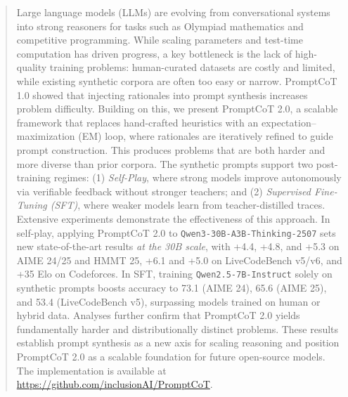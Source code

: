 \begin{abstract}
Large language models (LLMs) are evolving from conversational systems into strong reasoners for tasks such as Olympiad mathematics and competitive programming. While scaling parameters and test-time computation has driven progress, a key bottleneck is the lack of high-quality training problems: human-curated datasets are costly and limited, while existing synthetic corpora are often too easy or narrow. PromptCoT 1.0 showed that injecting rationales into prompt synthesis increases problem difficulty. Building on this, we present PromptCoT 2.0, a scalable framework that replaces hand-crafted heuristics with an expectation–maximization (EM) loop, where rationales are iteratively refined to guide prompt construction. This produces problems that are both harder and more diverse than prior corpora. The synthetic prompts support two post-training regimes: (1) \emph{Self-Play}, where strong models improve autonomously via verifiable feedback without stronger teachers; and (2) \emph{Supervised Fine-Tuning (SFT)}, where weaker models learn from teacher-distilled traces. Extensive experiments demonstrate the effectiveness of this approach. In self-play, applying PromptCoT 2.0 to \texttt{Qwen3-30B-A3B-Thinking-2507} sets new state-of-the-art results \emph{at the 30B scale}, with +4.4, +4.8, and +5.3 on AIME 24/25 and HMMT 25, +6.1 and +5.0 on LiveCodeBench v5/v6, and +35 Elo on Codeforces. In SFT, training \texttt{Qwen2.5-7B-Instruct} solely on synthetic prompts boosts accuracy to 73.1 (AIME 24), 65.6 (AIME 25), and 53.4 (LiveCodeBench v5), surpassing models trained on human or hybrid data. Analyses further confirm that PromptCoT 2.0 yields fundamentally harder and distributionally distinct problems. These results establish prompt synthesis as a new axis for scaling reasoning and position PromptCoT 2.0 as a scalable foundation for future open-source models. The implementation is available at \url{https://github.com/inclusionAI/PromptCoT}.
\end{abstract}


